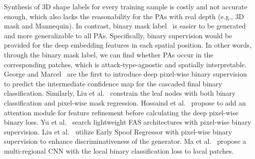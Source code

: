 \documentclass[10pt,journal,compsoc]{IEEEtran}
\begin{document}
Synthesis of 3D shape labels for every training sample is costly and not accurate enough, which also lacks the reasonability for the PAs with real depth (e.g., 3D mask and Mannequin). In contrast, binary mask label~\cite{liu2019deep,george2019deep,hossaindeeppixbis,yu2020auto2,ma2020novel,liu2020disentangling,sun2020face2} is easier to be generated and more generalizable to all PAs. Specifically, binary supervision would be provided for the deep embedding features in each spatial position. In other words, through the binary mask label, we can find whether PAs occur in the corresponding patches, which is attack-type-agnostic and spatially interpretable. George and Marcel~\cite{george2019deep} are the first to introduce deep pixel-wise binary supervision to predict the intermediate confidence map for the cascaded final binary classification. Similarly, Liu et al.~\cite{liu2019deep} constrain the leaf nodes with both binary classification and pixel-wise mask regression. Hossaind et al.~\cite{hossaindeeppixbis} propose to add an attention module for feature refinement before calculating the deep pixel-wise binary loss. Yu et al.~\cite{yu2020auto2} search lightweight FAS architectures with pixel-wise binary supervision. Liu et al.~\cite{liu2020disentangling} utilize Early Spoof Regressor with pixel-wise binary supervision to enhance discriminativeness of the generator. Ma et al.~\cite{ma2020novel} propose a multi-regional CNN with the local binary classification loss to local patches. 


\end{document}
